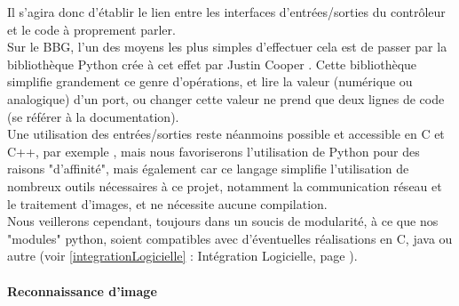			Il s'agira donc d'établir le lien entre les interfaces d'entrées/sorties du contrôleur et le code à proprement parler.\\

			Sur le BBG, l'un des moyens les plus simples d'effectuer cela est de passer par la bibliothèque Python crée à cet effet par Justin Cooper \cite{bib14} \cite{bib15}. Cette bibliothèque simplifie grandement ce genre d'opérations, et lire la valeur (numérique ou analogique) d'un port, ou changer cette valeur ne prend que deux lignes de code (se référer à la documentation).\\

			Une utilisation des entrées/sorties reste néanmoins possible et accessible en C et C++, par exemple \cite{bib16}, mais nous favoriserons l'utilisation de Python pour des raisons "d'affinité", mais également car ce langage simplifie l'utilisation de nombreux outils nécessaires à ce projet, notamment la communication réseau et le traitement d'images, et ne nécessite aucune compilation.\\

			Nous veillerons cependant, toujours dans un soucis de modularité, à ce que nos "modules" python, soient compatibles avec d'éventuelles réalisations en C, java ou autre (voir \ref{integrationLogicielle} : Intégration Logicielle, page \pageref{integrationLogicielle}).

		\paragraph{Reconnaissance d'image}
			


